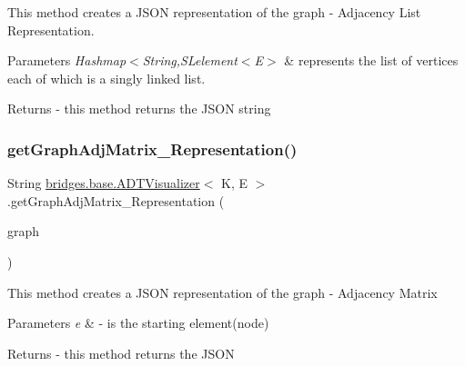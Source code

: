 This method creates a J\+S\+ON representation of the graph -\/ Adjacency List Representation. 
\begin{DoxyParams}{Parameters}
{\em Hashmap$<$\+String,S\+Lelement$<$\+E$>$} & represents the list of vertices each of which is a singly linked list. \\
\hline
\end{DoxyParams}
\begin{DoxyReturn}{Returns}
-\/ this method returns the J\+S\+ON string 
\end{DoxyReturn}
\hypertarget{classbridges_1_1base_1_1_a_d_t_visualizer_a7e3ecfc9522596bd12f0adef694eacf2}{}\label{classbridges_1_1base_1_1_a_d_t_visualizer_a7e3ecfc9522596bd12f0adef694eacf2} 
\subsubsection{\texorpdfstring{get\+Graph\+Adj\+Matrix\+\_\+\+Representation()}{getGraphAdjMatrix\_Representation()}}
{\footnotesize\ttfamily String \hyperlink{classbridges_1_1base_1_1_a_d_t_visualizer}{bridges.\+base.\+A\+D\+T\+Visualizer}$<$ K, E $>$.get\+Graph\+Adj\+Matrix\+\_\+\+Representation (\begin{DoxyParamCaption}\item[{\hyperlink{classbridges_1_1base_1_1_graph_adj_matrix}{Graph\+Adj\+Matrix}$<$ K, E $>$}]{graph }\end{DoxyParamCaption})}

This method creates a J\+S\+ON representation of the graph -\/ Adjacency Matrix


\begin{DoxyParams}{Parameters}
{\em e} & -\/ is the starting element(node) \\
\hline
\end{DoxyParams}
\begin{DoxyReturn}{Returns}
-\/ this method returns the J\+S\+ON 
\end{DoxyReturn}
\hypertarget{classbridges_1_1base_1_1_a_d_t_visualizer_a27fa70e9eaeb169697fac3ad8cb8a0ec}{}\label{classbridges_1_1base_1_1_a_d_t_visualizer_a27fa70e9eaeb169697fac3ad8cb8a0ec} 
